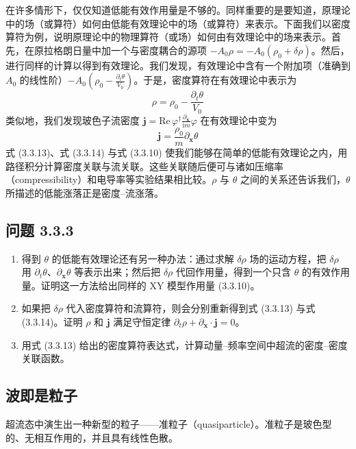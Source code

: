 在许多情形下，仅仅知道低能有效作用量是不够的。同样重要的是要知道，原理论中的场（或算符）如何由低能有效理论中的场（或算符）来表示。下面我们以密度算符为例，说明原理论中的物理算符（或场）如何由有效理论中的场来表示。首先，在原拉格朗日量中加一个与密度耦合的源项 $-A_0\rho = -A_0(\rho_0 + \delta\rho)$。然后，进行同样的计算以得到有效理论。我们发现，有效理论中含有一个附加项（准确到 $A_0$ 的线性阶）$-A_0(\rho_0 - \frac{\partial_t\theta}{V_0})$。于是，密度算符在有效理论中表示为
\begin{equation*}
\rho = \rho_0 - \frac{\partial_t\theta}{V_0}\tag{3.3.13}
\end{equation*}
类似地，我们发现玻色子流密度 $\pmb{j} = \mathrm{Re}\,\varphi^{\dagger}\frac{\partial_{\pmb{x}}}{\mathrm{i}m}\varphi$ 在有效理论中变为
\begin{equation*}
\pmb{j} = \frac{\rho_0}{m}\partial_{\pmb{x}}\theta\tag{3.3.14}
\end{equation*}
式 (3.3.13)、式 (3.3.14) 与式 (3.3.10) 使我们能够在简单的低能有效理论之内，用路径积分计算密度关联与流关联。这些关联随后便可与诸如压缩率（compressibility）和电导率等实验结果相比较。$\rho$ 与 $\theta$ 之间的关系还告诉我们，$\theta$ 所描述的低能涨落正是密度–流涨落。

\subsection*{问题 3.3.3}

\begin{enumerate}
\item[(a)] 得到 $\theta$ 的低能有效理论还有另一种办法：通过求解 $\delta\rho$ 场的运动方程，把 $\delta\rho$ 用 $\partial_t\theta$、$\partial_{\pmb{x}}\theta$ 等表示出来；然后把 $\delta\rho$ 代回作用量，得到一个只含 $\theta$ 的有效作用量。证明这一方法给出同样的 XY 模型作用量 (3.3.10)。
\item[(b)] 如果把 $\delta\rho$ 代入密度算符和流算符，则会分别重新得到式 (3.3.13) 与式 (3.3.14)。证明 $\rho$ 和 $\pmb{j}$ 满足守恒定律 $\partial_t\rho + \partial_{\pmb{x}}\cdot\pmb{j} = 0$。
\item[(c)] 用式 (3.3.13) 给出的密度算符表达式，计算动量–频率空间中超流的密度–密度关联函数。
\end{enumerate}

\subsection{波即是粒子}

\begin{keypoints}
\item 超流态中演生出一种新型的粒子——准粒子（quasiparticle）。准粒子是玻色型的、无相互作用的，并且具有线性色散。
\end{keypoints}

